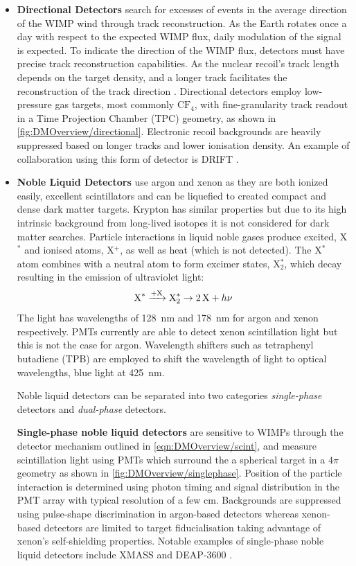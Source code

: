 \begin{itemize}
    \item \textbf{Directional Detectors} search for excesses of events in the average direction of the WIMP wind through track reconstruction. As the Earth rotates once a day with respect to the expected WIMP flux, daily modulation of the signal is expected. To indicate the direction of the WIMP flux, detectors must have precise track reconstruction capabilities. As the nuclear recoil’s track length depends on the target density, and a longer track facilitates the reconstruction of the track direction \cite{Schumann:2019eaa}. Directional detectors employ low-pressure gas targets, most commonly $\text{CF}_4$, with fine-granularity track readout in a Time Projection Chamber (TPC) geometry, as shown in \autoref{fig:DMOverview/directional}. Electronic recoil backgrounds are heavily suppressed based on longer tracks and lower ionisation density. An example of collaboration using this form of detector is DRIFT \cite{BATTAT201765}.

    \item \textbf{Noble Liquid Detectors} use argon and xenon as they are both ionized easily, excellent scintillators and can be liquefied to created compact and dense dark matter targets. Krypton has similar properties but due to its high intrinsic background from long-lived isotopes it is not considered for dark matter searches. Particle interactions in liquid noble gases produce excited, X$^*$ and ionised atoms, X$^+$, as well as heat (which is not detected). The X$^*$ atom combines with a neutral atom to form excimer states, X$^*_2$, which decay resulting in the emission of ultraviolet light:
    \begin{equation}\label{eqn:DMOverview/scint}
        \textnormal{X}^*  \xrightarrow{+\textnormal{X}} \textnormal{X}^*_2 \rightarrow 2\, \textnormal{X} + h \nu
    \end{equation}
    The light has wavelengths of 128~nm and 178~nm for argon and xenon respectively. PMTs currently are able to detect xenon scintillation light but this is not the case for argon. Wavelength shifters such as tetraphenyl butadiene (TPB) are employed to shift the wavelength of light to optical wavelengths, blue light at 425~nm. 
    
    Noble liquid detectors can be separated into two categories \textit{single-phase} detectors and \textit{dual-phase} detectors.

    \textbf{Single-phase noble liquid detectors} are sensitive to WIMPs through the detector mechanism outlined in \autoref{eqn:DMOverview/scint}, and measure scintillation light using PMTs which surround the a spherical target in a $4\pi$ geometry as shown in \autoref{fig:DMOverview/singlephase}. Position of the particle interaction is determined using photon timing and signal distribution in the PMT array with typical resolution of a few cm. Backgrounds are suppressed using pulse-shape discrimination in argon-based detectors whereas xenon-based detectors are limited to target fiducialisation taking advantage of xenon's self-shielding properties. Notable examples of single-phase noble liquid detectors include XMASS \cite{Abe:2013tc} and DEAP-3600 \cite{DEAP-3600:2024szw}.


\end{itemize}

